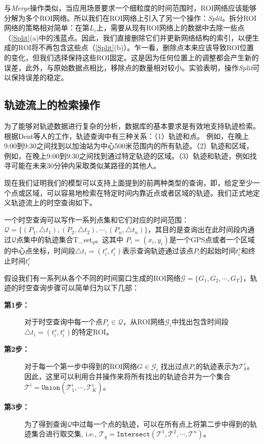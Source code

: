 

与\emph{Merge}操作类似，当应用场景要求一个细粒度的时间范围时，ROI网络应该能够分解为多个ROI网络。所以我们在ROI网络上引入了另一个操作：\emph{Split}。拆分ROI网络的策略相对简单：在第$L_i$上，需要从现有ROI网络上的数据中去除一些点（\ref{Split}(a)中的浅蓝点。因此，我们直接删除它们并更新网络结构的索引，以便生成的ROI将不再包含这些点（\ref{Split}(b)）。乍一看，删除点本来应该导致ROI位置的变化，但我们选择保持这些ROI固定。这是因为任何位置上的调整都会产生新的误差，此外，与原始数据点相比，移除点的数量相对较小。实验表明，操作\emph{Split}可以保持误差的稳定。

\subsection{轨迹流上的检索操作}
为了能够对轨迹数据进行复杂的分析，数据库的基本要求是有效地支持轨迹检索。根据Dent等人\cite {deng2011trajectory}的工作，轨迹查询中有三种关系：（1）轨迹和点。 例如，在晚上9:00到9:30之间找到以加油站为中心500米范围内的所有轨迹。（2）轨迹和区域，例如，在晚上9:00到9:30之间找到通过特定轨迹的区域。（3）轨迹和轨迹，例如找寻可能在未来30分钟内采取类似某路径的其他人。

现在我们证明我们的模型可以支持上面提到的前两种类型的查询，即，给定至少一个点或区域，可以容易地检索在特定时间内靠近点或者区域的轨迹。我们正式地定义轨迹流上的时空查询如下。


\begin{dingyi}[轨迹的时空查询]
一个时空查询可以写作一系列点集和它们对应的时间范围：$\mathcal{Q} = \{(P_1, \triangle t_1), (P_2, \triangle t_2), \cdots, (P_n, \triangle t_n)\}$，其目的是查询出在此时间段内通过$\mathcal{Q}$点集中的轨迹集合\gls{T_set}$_q$。这其中 $P_i = (x_i, y_i)$是一个GPS点或者一个区域的中心点坐标，时间段$\triangle t_i = (t^s_i, t^e_i)$表示查询轨迹通过该点$P_i$的起始时间$t^s_i$和终止时间$t^e_i$
\end{dingyi}

假设我们有一系列从各个不同的时间窗口生成的ROI网络$\mathcal{G} = \{G_1, G_2, \cdots, G_T\}$，轨迹的时空查询步骤可以简单归为以下几部：

\begin{description}
\item[\textbf{第1步：}]对于时空查询中每一个点$P_i \in \mathcal{Q}$，从ROI网络$\mathcal{G}_i$中找出包含时间段$\triangle t_i = (t^s_i, t^e_i)$的特定ROI。
\vspace{1mm}

\item[\textbf{第2步：}]对于每一个第一步中得到的ROI网络$G \in \mathcal{G}_i$ 找出过点$P_i$的轨迹表示为$\mathcal{T}^i_k$。因此，这里可以利用合并操作来将所有找出的轨迹合并为一个集合$\mathcal{T}^i = \texttt{Union}(\mathcal{T}^i_1, \cdots, \mathcal{T}^i_K)$。
\vspace{1mm}

\item[\textbf{第3步：}]为了得到查询$\mathcal{Q}$中过每一个点的轨迹，可以在所有点上将第二步中得到的轨迹集合进行取交集, i.e., $\mathcal{T}_q = \texttt{Intersect}(\mathcal{T}^1, \mathcal{T}^2, \cdots, \mathcal{T}^n)$。
\end{description}

